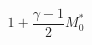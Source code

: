 \documentclass[12pt]{article}
\begin{document}
\begin{equation}
1 + \frac{\gamma - 1}{2} M_0^*
\end{equation}
\end{document}
